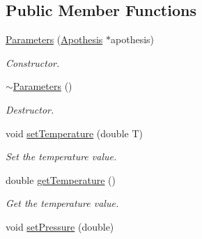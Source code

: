 \subsection*{Public Member Functions}
\begin{DoxyCompactItemize}
\item 
\mbox{\label{classUtils_1_1Parameters_a380d08553bc406d2cc3e2e4885a68de2}} 
\mbox{\hyperlink{classUtils_1_1Parameters_a380d08553bc406d2cc3e2e4885a68de2}{Parameters}} (\mbox{\hyperlink{classApothesis}{Apothesis}} $\ast$apothesis)
\begin{DoxyCompactList}\small\item\em Constructor. \end{DoxyCompactList}\item 
\mbox{\label{classUtils_1_1Parameters_a3e7985fcdc6cc28fdd178c503ab4a71f}} 
\mbox{\hyperlink{classUtils_1_1Parameters_a3e7985fcdc6cc28fdd178c503ab4a71f}{$\sim$\+Parameters}} ()
\begin{DoxyCompactList}\small\item\em Destructor. \end{DoxyCompactList}\item 
\mbox{\label{classUtils_1_1Parameters_a2c4ca8ee4caffed82b37de23b04f27a3}} 
void \mbox{\hyperlink{classUtils_1_1Parameters_a2c4ca8ee4caffed82b37de23b04f27a3}{set\+Temperature}} (double T)
\begin{DoxyCompactList}\small\item\em Set the temperature value. \end{DoxyCompactList}\item 
\mbox{\label{classUtils_1_1Parameters_abb85d8b05fbe6d29673fc38af858f57c}} 
double \mbox{\hyperlink{classUtils_1_1Parameters_abb85d8b05fbe6d29673fc38af858f57c}{get\+Temperature}} ()
\begin{DoxyCompactList}\small\item\em Get the temperature value. \end{DoxyCompactList}\item 
\mbox{\label{classUtils_1_1Parameters_a7011b133a1474ea8ebcc05b16445a0cb}} 
void \mbox{\hyperlink{classUtils_1_1Parameters_a7011b133a1474ea8ebcc05b16445a0cb}{set\+Pressure}} (double)

\end{DoxyCompactItemize}
